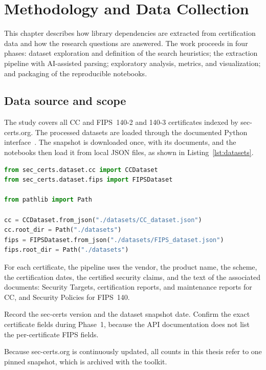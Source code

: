 \chapter{Methodology and Data Collection}
\label{ch:method}

This chapter describes how library dependencies are extracted from
certification data and how the research questions are answered. The work
proceeds in four phases: dataset exploration and definition of the search
heuristics; the extraction pipeline with AI-assisted parsing; exploratory
analysis, metrics, and visualization; and packaging of the reproducible
notebooks.

\section{Data source and scope}
\label{sec:data}

The study covers all CC and FIPS~140-2 and 140-3 certificates indexed by
sec-certs.org. The processed datasets are loaded through the documented Python
interface~\cite{seccertsDocs}. The snapshot is downloaded once, with its
documents, and the notebooks then load it from local JSON files, as shown in
Listing~\ref{lst:datasets}.

\begin{lstlisting}[language=Python, caption={Loading the processed datasets},
  label={lst:datasets}]
from sec_certs.dataset.cc import CCDataset
from sec_certs.dataset.fips import FIPSDataset

from pathlib import Path

cc = CCDataset.from_json("./datasets/CC_dataset.json")
cc.root_dir = Path("./datasets")
fips = FIPSDataset.from_json("./datasets/FIPS_dataset.json")
fips.root_dir = Path("./datasets")
\end{lstlisting}

For each certificate, the pipeline uses the vendor, the product name, the
scheme, the certification dates, the certified security claims, and the text of
the associated documents: Security Targets, certification reports, and
maintenance reports for CC, and Security Policies for FIPS~140.

{Record the sec-certs version and the dataset snapshot date. Confirm the
exact certificate fields during Phase~1, because the API documentation does not
list the per-certificate FIPS fields.}

Because sec-certs.org is continuously updated, all counts in this thesis refer
to one pinned snapshot, which is archived with the toolkit.

